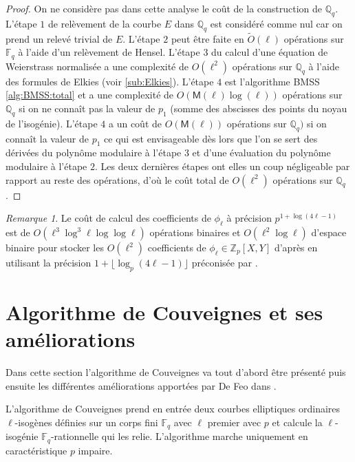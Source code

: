 \documentclass[10pt,a4paper]{book}
\theoremstyle{plain}
\theoremstyle{definition}
\theoremstyle{definition}
\theoremstyle{definition}
\theoremstyle{definition}
\theoremstyle{remark}
\newtheorem{rem}[thm]{Remarque}
\theoremstyle{remark}
\theoremstyle{definition}
\begin{document}
\begin{proof}
On ne considère pas dans cette analyse le coût de la construction de $\mathbb{Q}_q$.
L'étape $1$ de relèvement de la courbe $E$ dans $\mathbb{Q}_q$ est considéré comme nul car on prend un relevé trivial de $E$.
L'étape $2$ peut être faite en $\tilde{O}(\ell)$ opérations sur $\mathbb{F}_q$ à l'aide d'un relèvement de Hensel. 
L'étape $3$ du calcul d'une équation de Weierstrass normalisée a une complexité de $O(\ell^2)$ opérations sur $\mathbb{Q}_q$ à l'aide des formules de Elkies \cite{elkies1998} (voir \ref{sub:Elkies}).
L'étape $4$ est l'algorithme BMSS \ref{alg:BMSS:total} et a une complexité de $O(\mathsf{M}(\ell)\log(\ell))$ opérations sur $\mathbb{Q}_q$ si on ne connaît pas la valeur de $p_1$ (somme des abscisses des points du noyau de l'isogénie). L'étape $4$ a un coût de $O(\mathsf{M}(\ell))$ opérations sur $\mathbb{Q}_q)$ si on connaît la valeur de $p_1$ ce qui est envisageable dès lors que l'on se sert des dérivées du polynôme modulaire à l'étape $3$ et d'une évaluation du polynôme modulaire à l'étape $2$.
Les deux dernières étapes ont elles un coup négligeable par rapport au reste des opérations, d'où le coût total de $O(\ell^2)$ opérations sur $\mathbb{Q}_q$.
\end{proof}

\begin{rem}
Le coût de calcul des coefficients de $\phi_{\ell}$ à précision $p^{1+\log(4\ell -1)}$ est de $O(\ell^3 \log^3\ell \log\log\ell)$ opérations binaires et $O(\ell^2 \log \ell)$ d'espace binaire pour stocker les $O(\ell^2)$ coefficients de $\phi_{\ell} \in \mathbb{Z}_p[X,Y]$ d'après \cite[Algorithm 6.1, Theorem 1]{BLS12} en utilisant la précision $1+ \lfloor \log_p(4\ell-1) \rfloor$ préconisée par \cite{LairezVaccon16}.
\end{rem}


\section{Algorithme de Couveignes et ses améliorations}
Dans cette section l'algorithme de Couveignes \cite{Couveignes96} va tout d'abord être présenté puis ensuite les différentes améliorations apportées par De Feo dans \cite{DeFeo10}.

L'algorithme de Couveignes prend en entrée deux courbes elliptiques  ordinaires $\ell$-isogènes définies sur un corps fini $\mathbb{F}_q$ avec $\ell$ premier avec $p$ et calcule la $\ell$-isogénie $\mathbb{F}_q$-rationnelle qui les relie. L'algorithme marche uniquement en caractéristique $p$ impaire. 
\end{document}
